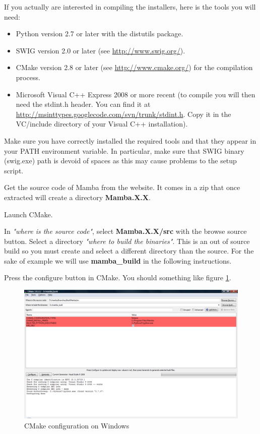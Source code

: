 \documentclass[a4paper,10pt,oneside]{article}
\begin{document}
If you actually are interested in compiling the installers, here is the tools
you will need:

\begin{itemize}
\item Python version 2.7 or later with the distutils package.
\item SWIG version 2.0 or later (see \url{http://www.swig.org/}).
\item CMake version 2.8 or later (see \url{http://www.cmake.org/}) for the 
compilation process.
\item Microsoft Visual C++ Express 2008 or more recent (to compile you will then need
the stdint.h header. You can find it at 
\url{http://msinttypes.googlecode.com/svn/trunk/stdint.h}. Copy it in the VC/include 
directory of your Visual C++ installation).
\end{itemize}

Make sure you have correctly installed the required tools and that they appear
in your PATH environment variable. In particular, make sure that SWIG binary
(swig.exe) path is devoid of spaces as this may cause problems to the setup
script.

Get the source code of Mamba from the website. It comes in a zip that once
extracted will create a directory \textbf{Mamba.X.X}.

Launch CMake.

In \textit{"where is the source code"}, select \textbf{Mamba.X.X/src} with
the browse source button. Select a directory \textit{"where to build the binaries"}.
This is an out of source build so you must create and select a different
directory than the source. For the sake of example we will use
\textbf{mamba\_build} in the following instructions.

Press the configure button in CMake. You should something like figure \ref{fig:cmake_win}.

\begin{figure}
\centering
\includegraphics[scale=0.3]{images/cmake_win.png}
\caption{CMake configuration on Windows}
\label{fig:cmake_win}
\end{figure}
\end{document}
